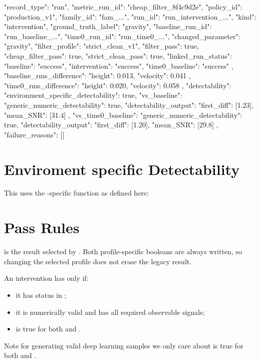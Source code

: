 \documentclass[11pt]{article}
\begin{document}
\begin{DocCode}
{
  "record_type": "run",
  "metric_run_id": "cheap_filter_8f4c9d2e",
  "policy_id": "production_v1",
  "family_id": "fam_...",
  "run_id": "run_intervention_...",
  "kind": "intervention",
  "ground_truth_label": "gravity",
  "baseline_run_id": "run_baseline_...",
  "time0_run_id": "run_time0_...",
  "changed_parameter": "gravity",
  "filter_profile": "strict_clean_v1",
  "filter_pass": true,
  "cheap_filter_pass": true,
  "strict_clean_pass": true,
  "linked_run_status": {
    "baseline": "success",
    "intervention": "success",
    "time0_baseline": "success"
  },
  "baseline_rms_difference": {
    "height": 0.013,
    "velocity": 0.041
  },
  "time0_rms_difference": {
    "height": 0.020,
    "velocity": 0.058
  },
  "detectability": {
    "environment_specific_detectability": true,
    "vs_baseline": {
      "generic_numeric_detectability": true,
      "detectability_output": {
        "first_diff": [1.23],
        "mean_SNR": [31.4]
      }
    },
    "vs_time0_baseline": {
      "generic_numeric_detectability": true,
      "detectability_output": {
        "first_diff": [1.20],
        "mean_SNR": [29.8]
      }
    }
  },
  "failure_reasons": []
}
\end{DocCode}


\section*{Enviroment specific Detectability}
This uses the \termSimulator-specific function  as defined here:

\section*{Pass Rules}

 is the result selected by .
Both profile-specific booleans are always written, so changing the selected profile does not erase the legacy result.

An intervention has  only if:

\begin{itemize}
\item it has status  in ;
\item it is numerically valid and has all required observable signals;
\item {} is true for both  and .
\end{itemize}
Note for generating valid deep learning samples we only care about  is true for both  and .
\end{document}
